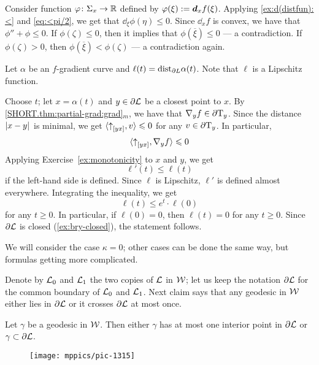 Consider function $\varphi\colon\Sigma_x\to\mathbb{R}$ defined by $\varphi(\xi)\mathrel{:=}\bm{d}_xf(\xi)$.
Applying \ref{ex:d(distfun):<} and \ref{eq:<pi/2}, we get that $\dd_\xi\phi(\eta)\le 0$.
Since $\dd_xf$ is convex, we have that $\phi''+\phi\le 0$.
If $\phi(\zeta)\le 0$, then it implies that $\phi(\overline{\xi})\le 0$ --- a contradiction.
If $\phi(\zeta)> 0$, then $\phi(\overline{\xi})<\phi(\zeta)$ --- a contradiction again.

Let $\alpha$ be an $f$-gradient curve and $\ell(t)=\mathrm{dist}_{\partial L}\alpha(t)$.
Note that $\ell$ is a Lipschitz function.

Choose $t$;
let $x=\alpha(t)$ and $y\in \partial\mathcal{L}$ be a closest point to $x$.
By \ref{SHORT.thm:partial-grad:grad}$_m$, we have that $\nabla_y f\in\partial \mathrm{T}_y$.
Since the distance $\dist{x}{y}{}$ is minimal, 
we get $\langle {\uparrow}_{[{y}{x}]},v\rangle\leqslant 0$ for any $v\in \partial \mathrm{T}_y$.
In particular,
\[\langle {\uparrow}_{[{y}{x}]},\nabla_y f\rangle\leqslant 0\]
Applying Exercise~\ref{ex:monotonicity} to $x$ and $y$, 
we get
\[\ell'(t)\le \ell(t)\]
if the left-hand side is defined.
Since $\ell$ is Lipschitz, $\ell'$ is defined almost everywhere.
Integrating the inequality, we get 
\[\ell(t)\le e^t\cdot\ell(0)\]
for any $t\ge 0$.
In particular, if $\ell(0)=0$, then $\ell(t)=0$ for any $t\ge 0$.
Since $\partial\mathcal{L}$ is closed (\ref{ex:bry-closed}), the statement follows.

We will consider the case $\kappa=0$;
other cases can be done the same way, but formulas getting more complicated.

Denote by $\mathcal{L}_0$ and $\mathcal{L}_1$ the two copies of $\mathcal{L}$ in $\mathcal{W}$;
let us keep the notation $\partial \mathcal{L}$ for the common boundary of $\mathcal{L}_0$ and $\mathcal{L}_1$.
Next claim says that any geodesic in $\mathcal{W}$ either lies in $\partial \mathcal{L}$ or it crosses $\partial \mathcal{L}$ at most once.

\begin{clm}{}
Let $\gamma$ be a geodesic in $\mathcal{W}$.
Then either $\gamma$ has at most one interior point in $\partial \mathcal{L}$ or
$\gamma\subset \partial \mathcal{L}$.
\end{clm}

\begin{wrapfigure}{r}{45mm}
\vskip-2mm
\centering
\texttt{[image: mppics/pic-1315]}
\end{wrapfigure}

